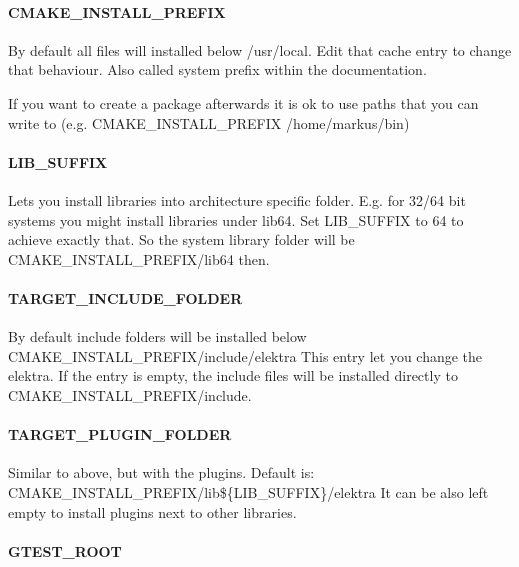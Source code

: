 \paragraph*{C\+M\+A\+K\+E\+\_\+\+I\+N\+S\+T\+A\+L\+L\+\_\+\+P\+R\+E\+F\+I\+X}

By default all files will installed below /usr/local. Edit that cache entry to change that behaviour. Also called system prefix within the documentation.

If you want to create a package afterwards it is ok to use paths that you can write to (e.\+g. C\+M\+A\+K\+E\+\_\+\+I\+N\+S\+T\+A\+L\+L\+\_\+\+P\+R\+E\+F\+I\+X /home/markus/bin)

\paragraph*{L\+I\+B\+\_\+\+S\+U\+F\+F\+I\+X}

Lets you install libraries into architecture specific folder. E.\+g. for 32/64 bit systems you might install libraries under lib64. Set L\+I\+B\+\_\+\+S\+U\+F\+F\+I\+X to 64 to achieve exactly that. So the system library folder will be C\+M\+A\+K\+E\+\_\+\+I\+N\+S\+T\+A\+L\+L\+\_\+\+P\+R\+E\+F\+I\+X/lib64 then.

\paragraph*{T\+A\+R\+G\+E\+T\+\_\+\+I\+N\+C\+L\+U\+D\+E\+\_\+\+F\+O\+L\+D\+E\+R}

By default include folders will be installed below C\+M\+A\+K\+E\+\_\+\+I\+N\+S\+T\+A\+L\+L\+\_\+\+P\+R\+E\+F\+I\+X/include/elektra This entry let you change the elektra. If the entry is empty, the include files will be installed directly to C\+M\+A\+K\+E\+\_\+\+I\+N\+S\+T\+A\+L\+L\+\_\+\+P\+R\+E\+F\+I\+X/include.

\paragraph*{T\+A\+R\+G\+E\+T\+\_\+\+P\+L\+U\+G\+I\+N\+\_\+\+F\+O\+L\+D\+E\+R}

Similar to above, but with the plugins. Default is\+: C\+M\+A\+K\+E\+\_\+\+I\+N\+S\+T\+A\+L\+L\+\_\+\+P\+R\+E\+F\+I\+X/lib\$\{L\+I\+B\+\_\+\+S\+U\+F\+F\+I\+X\}/elektra It can be also left empty to install plugins next to other libraries.

\paragraph*{G\+T\+E\+S\+T\+\_\+\+R\+O\+O\+T}

